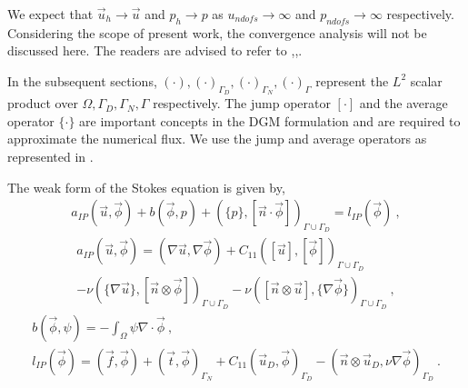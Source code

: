 \documentclass[graybox]{svmult}
\begin{document}
We expect that $\overrightarrow{u}_h \rightarrow \overrightarrow{u}$ and $p_h \rightarrow p$ as $u_{ndofs} \rightarrow \infty$ and $p_{ndofs} \rightarrow \infty$ respectively. Considering the scope of present work, the convergence analysis will not be discussed here. The readers are advised to refer to \cite{pacciarini},\cite{jump_mean_operator},\cite{riviere}.

In the subsequent sections, $\left( \cdot \right),\left( \cdot \right)_{\Gamma_D},\left( \cdot \right)_{\Gamma_N},\left( \cdot \right)_{\Gamma}$ represent the $L^2$ scalar product over $\Omega,\Gamma_D,\Gamma_N,\Gamma$ respectively. The jump operator $\left[ \cdot \right]$ and the average operator $\lbrace \cdot \rbrace$ are important concepts in the DGM formulation and are required to approximate the numerical flux. We use the jump and average operators as represented in \cite{jump_mean_operator}.

The weak form of the Stokes equation is given by,
\begin{gather}\label{stokes_weak_ch3}
a_{IP}(\overrightarrow{u},\overrightarrow{\phi}) + b(\overrightarrow{\phi},p) + \left( \lbrace p \rbrace,[\overrightarrow{n} \cdot \overrightarrow{\phi}] \right)_{\Gamma \cup \Gamma_D} = l_{IP}(\overrightarrow{\phi}) \ ,
\end{gather}
\begin{equation}
\begin{split}
a_{IP}(\overrightarrow{u},\overrightarrow{\phi}) = \left( \nabla \overrightarrow{u}, \nabla \overrightarrow{\phi} \right) + C_{11} \left( [\overrightarrow{u}],[\overrightarrow{\phi}] \right)_{\Gamma \cup \Gamma_D} \\ - \nu \left( \lbrace \nabla \overrightarrow{u}\rbrace ,[\overrightarrow{n} \otimes \overrightarrow{\phi}] \right)_{\Gamma \cup \Gamma_D} - \nu \left( [\overrightarrow{n} \otimes \overrightarrow{u}], \lbrace \nabla \overrightarrow{\phi} \rbrace \right)_{\Gamma \cup \Gamma_D} \ ,
\end{split}
\end{equation}
\begin{gather}
b(\overrightarrow{\phi},\psi) = -\int_{\Omega} \psi \nabla \cdot \overrightarrow{\phi} \ , \\
l_{IP}(\overrightarrow{\phi}) = \left( \overrightarrow{f},\overrightarrow{\phi} \right) + \left( \overrightarrow{t},\overrightarrow{\phi} \right)_{\Gamma_N} + C_{11} \left(\overrightarrow{u}_D,\overrightarrow{\phi}\right)_{\Gamma_D} - \left( \overrightarrow{n} \otimes \overrightarrow{u}_D, \nu \nabla \overrightarrow{\phi} \right)_{\Gamma_D} \ .
\end{gather}
\end{document}
